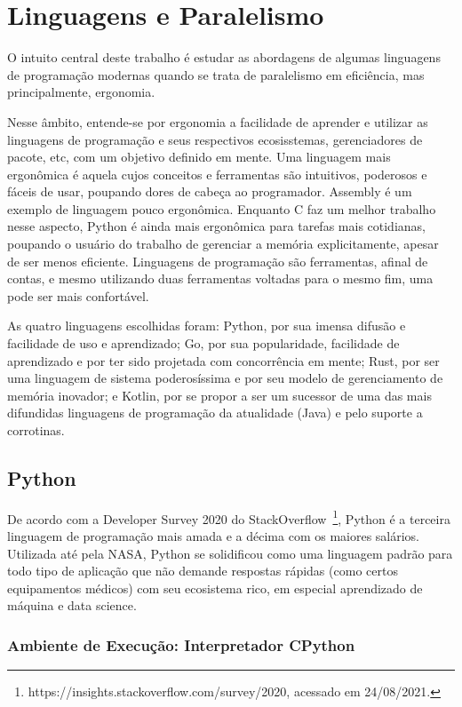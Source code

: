 \documentclass[12pt,a4paper]{article}
\begin{document}
\section{Linguagens e Paralelismo}
\label{sec:linguagens paralelismo}

O intuito central deste trabalho é estudar as abordagens de algumas linguagens de programação modernas quando se trata de paralelismo em eficiência, mas principalmente, ergonomia.

Nesse âmbito, entende-se por ergonomia a facilidade de aprender e utilizar as linguagens de programação e seus respectivos ecosisstemas, gerenciadores de pacote, etc, com um objetivo definido em mente. Uma linguagem mais ergonômica é aquela cujos conceitos e ferramentas são intuitivos, poderosos e fáceis de usar, poupando dores de cabeça ao programador. Assembly é um exemplo de linguagem pouco ergonômica. Enquanto C faz um melhor trabalho nesse aspecto, Python é ainda mais ergonômica para tarefas mais cotidianas, poupando o usuário do trabalho de gerenciar a memória explicitamente, apesar de ser menos eficiente. Linguagens de programação são ferramentas, afinal de contas, e mesmo utilizando duas ferramentas voltadas para o mesmo fim, uma pode ser mais confortável.

As quatro linguagens escolhidas foram: Python, por sua imensa difusão e facilidade de uso e aprendizado; Go, por sua popularidade, facilidade de aprendizado e por ter sido projetada com concorrência em mente; Rust, por ser uma linguagem de sistema poderosíssima e por seu modelo de gerenciamento de memória inovador; e Kotlin, por se propor a ser um sucessor de uma das mais difundidas linguagens de programação da atualidade (Java) e pelo suporte a corrotinas.

\subsection{Python}
\label{ssec:python}

De acordo com a Developer Survey 2020 do StackOverflow~\footnote{\label{foot:fn1} https://insights.stackoverflow.com/survey/2020, acessado em 24/08/2021.}, Python é a terceira linguagem de programação mais amada e a décima com os maiores salários. Utilizada até pela NASA, Python se solidificou como uma linguagem padrão para todo tipo de aplicação que não demande respostas rápidas (como certos equipamentos médicos) com seu ecosistema rico, em especial aprendizado de máquina e data science.

\subsubsection{Ambiente de Execução: Interpretador CPython}
\label{sssec:python ambiente execucao}
\end{document}
